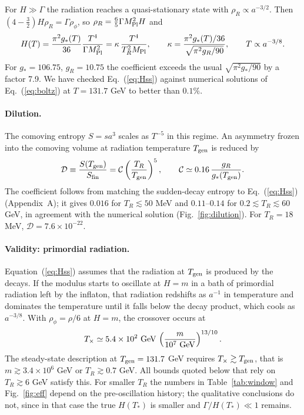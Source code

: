 \documentclass[11pt]{article}
\newcommand{\Mpl}{M_{\rm Pl}}
\begin{document}
For $H\gg\Gamma$ the radiation reaches a quasi-stationary state with $\rho_R\propto a^{-3/2}$. Then $(4-\tfrac32)H\rho_R=\Gamma\rho_\phi$, so $\rho_R=\tfrac65\Gamma\Mpl^2H$ and
\begin{equation}
H(T)=\frac{\pi^2 g_*(T)}{36}\frac{T^4}{\Gamma\Mpl^2}=\kappa\,\frac{T^4}{T_R^2\Mpl},\qquad
\kappa=\frac{\pi^2 g_*(T)/36}{\sqrt{\pi^2g_R/90}},\qquad T\propto a^{-3/8}.
\label{eq:Hss}
\end{equation}
For $g_*=106.75$, $g_R=10.75$ the coefficient exceeds the usual $\sqrt{\pi^2g_*/90}$ by a factor 7.9. We have checked Eq.~(\ref{eq:Hss}) against numerical solutions of Eq.~(\ref{eq:boltz}) at $T=131.7$ GeV to better than $0.1\%$.

\paragraph*{Dilution.}
The comoving entropy $S=sa^3$ scales as $T^{-5}$ in this regime. An asymmetry frozen into the comoving volume at radiation temperature $T_{\rm gen}$ is reduced by
\begin{equation}
\mathcal D\equiv\frac{S(T_{\rm gen})}{S_{\rm fin}}=\mathcal C\left(\frac{T_R}{T_{\rm gen}}\right)^5,\qquad
\mathcal C\simeq 0.16\,\frac{g_R}{g_*(T_{\rm gen})}.
\label{eq:D}
\end{equation}
The coefficient follows from matching the sudden-decay entropy to Eq.~(\ref{eq:Hss}) (Appendix~A); it gives $0.016$ for $T_R\lesssim50$ MeV and $0.11$--$0.14$ for $0.2\lesssim T_R\lesssim60$ GeV, in agreement with the numerical solution (Fig.~\ref{fig:dilution}). For $T_R=18$ MeV, $\mathcal D=7.6\times10^{-22}$.

\paragraph*{Validity: primordial radiation.}
Equation~(\ref{eq:Hss}) assumes that the radiation at $T_{\rm gen}$ is produced by the decays. If the modulus starts to oscillate at $H=m$ in a bath of primordial radiation left by the inflaton, that radiation redshifts as $a^{-1}$ in temperature and dominates the temperature until it falls below the decay product, which cools as $a^{-3/8}$. With $\rho_\phi=\rho/6$ at $H=m$, the crossover occurs at
\begin{equation}
T_\times\simeq 5.4\times10^{2}\ {\rm GeV}\,\left(\frac{m}{10^7\ {\rm GeV}}\right)^{13/10}.
\end{equation}
The steady-state description at $T_{\rm gen}=131.7$ GeV requires $T_\times\gtrsim T_{\rm gen}$, that is $m\gtrsim3.4\times10^6$ GeV or $T_R\gtrsim0.7$ GeV. All bounds quoted below that rely on $T_R\gtrsim6$ GeV satisfy this. For smaller $T_R$ the numbers in Table~\ref{tab:window} and Fig.~\ref{fig:eff} depend on the pre-oscillation history; the qualitative conclusions do not, since in that case the true $H(T_*)$ is smaller and $\Gamma/H(T_*)\ll1$ remains.
\end{document}
